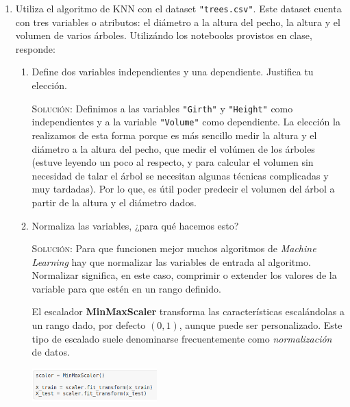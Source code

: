 \documentclass[letterpaper,11pt]{article}
\begin{document}
\begin{enumerate}
\begin{proof}
        Por lo tanto, el polinomio característico de la matriz $A$ puede ser 
        expresado como 
        \begin{equation*}
            p(\lambda) = \lambda^2 - \lambda tr(A) + det(A)
        \end{equation*}
    \end{proof}

    \item Utiliza el algoritmo de KNN con el dataset \texttt{"trees.csv"}. Este 
    dataset cuenta con tres variables o atributos: el diámetro a la altura del 
    pecho, la altura y el volumen de varios árboles. Utilizándo los notebooks 
    provistos en clase, responde:
    \begin{enumerate}
        \item Define dos variables independientes y una dependiente. Justifica 
        tu elección.

        \textsc{Solución:} Definimos a las variables \texttt{"Girth"} y 
        \texttt{"Height"} como independientes y a la variable \texttt{"Volume"}
        como dependiente. La elección la realizamos de esta forma porque es 
        más sencillo medir la altura y el diámetro a la altura del pecho, que 
        medir el volúmen de los árboles (estuve leyendo un poco al respecto, y 
        para calcular el volumen sin necesidad de talar el árbol se necesitan 
        algunas técnicas complicadas y muy tardadas). Por lo que, es útil poder 
        predecir el volumen del árbol a partir de la altura y el diámetro dados.

        \item Normaliza las variables, ¿para qué hacemos esto?

        \textsc{Solución:} Para que funcionen mejor muchos algoritmos de 
        \textit{Machine Learning} hay que normalizar las variables de entrada 
        al algoritmo. Normalizar significa, en este caso, comprimir o extender 
        los valores de la variable para que estén en un rango definido.

        El escalador \textbf{MinMaxScaler} transforma las características 
        escalándolas a un rango dado, por defecto $(0, 1)$, aunque puede ser 
        personalizado. Este tipo de escalado suele denominarse frecuentemente 
        como \textit{normalización} de datos.
        \begin{center}
            \includegraphics[width=0.4\textwidth]{imagenes/norma.png}
        \end{center}


\end{enumerate}
\end{enumerate}
\end{document}
